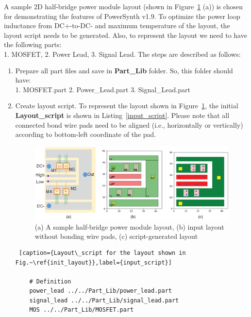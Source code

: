 \documentclass[11pt]{article}
\begin{document}
A sample 2D half-bridge power module layout (shown in Figure~\ref{init_layout} (a)) is chosen for demonstrating the features of PowerSynth v1.9. To optimize the power loop inductance from DC+-to-DC- and maximum temperature of the layout, the layout script needs to be generated. Also, to represent the layout we need to have the following parts:\\
1. MOSFET, 2. Power Lead, 3. Signal Lead. The steps are described as follows:
\begin{enumerate}
    \item Prepare all part files and save in \textbf{Part\_Lib} folder. So, this folder should have:\\
    1. MOSFET.part
    2. Power\_Lead.part
    3. Signal\_Lead.part
    
    \item Create layout script. To represent the layout shown in Figure~\ref{init_layout}, the initial \textbf{Layout\_script} is shown in Listing~\ref{input_script}. Please note that all connected bond wire pads need to be aligned (i.e., horizontally or vertically) according to bottom-left coordinate of the pad.
    
    \begin{figure}[H]
    \centering
    \includegraphics[width=\linewidth ]{figs/v_1.9_figs/Fig_example_layout.eps}
    \caption{(a) A sample half-bridge power module layout, (b) input layout without bonding wire pads, (c) script-generated layout}
    \label{init_layout}
    \end{figure}
    

    \pagebreak
    \begin{lstlisting} [caption={Layout\_script for the layout shown in Fig.~\ref{init_layout}},label={input_script}]
    
    # Definition
    power_lead ../../Part_Lib/power_lead.part
    signal_lead ../../Part_Lib/signal_lead.part
    MOS ../../Part_Lib/MOSFET.part
    

\end{lstlisting}
\end{enumerate}
\end{document}
